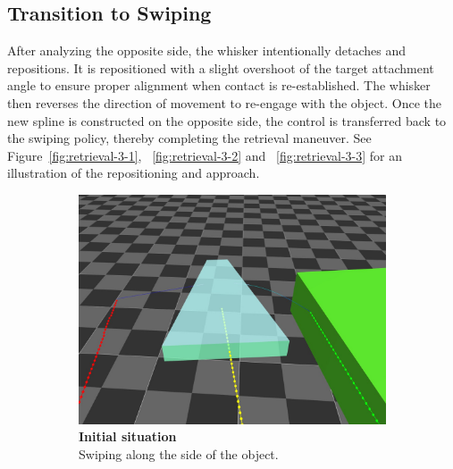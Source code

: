 \subsection{Transition to Swiping}
After analyzing the opposite side, the whisker intentionally detaches and repositions.
It is repositioned with a slight overshoot of the target attachment angle to ensure proper alignment when contact is re-established.
The whisker then reverses the direction of movement to re-engage with the object.
Once the new spline is constructed on the opposite side, the control is transferred back to the swiping policy, thereby completing the retrieval maneuver.
See Figure~\ref{fig:retrieval-3-1}, ~\ref{fig:retrieval-3-2} and ~\ref{fig:retrieval-3-3} for an illustration of the repositioning and approach.

\begin{figure}[H]
    \centering
    \begin{subfigure}[b]{0.48\textwidth}
        \centering
        \captionsetup{justification=centering}
        \includegraphics[width=\textwidth]{figures/retrieval/before}
        \caption{\textbf{Initial situation}\\Swiping along the side of the object.}
        \label{fig:retrieval-0-1}
    \end{subfigure}\hfill
    \begin{subfigure}[b]{0.48\textwidth}
        \centering
        \captionsetup{justification=centering}

\end{subfigure}
\end{figure}
